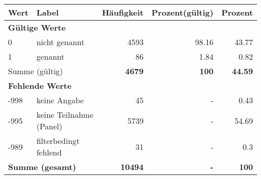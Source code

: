      \begin{longtable}{lXrrr}
     \toprule
     \textbf{Wert} & \textbf{Label} & \textbf{Häufigkeit} & \textbf{Prozent(gültig)} & \textbf{Prozent} \\
     \endhead
     \midrule
     \multicolumn{5}{l}{\textbf{Gültige Werte}}\\

     0 &
     \multicolumn{1}{X}{ nicht genannt   } &


       \num{4593} &
       \num[round-mode=places,round-precision=2]{98.16} &
         \num[round-mode=places,round-precision=2]{43.77} \\

     1 &
     \multicolumn{1}{X}{ genannt   } &


       \num{86} &
       \num[round-mode=places,round-precision=2]{1.84} &
         \num[round-mode=places,round-precision=2]{0.82} \\
     \midrule
     \multicolumn{2}{l}{Summe (gültig)} &
       \textbf{\num{4679}} &
     \textbf{\num{100}} &
       \textbf{\num[round-mode=places,round-precision=2]{44.59}} \\
     \multicolumn{5}{l}{\textbf{Fehlende Werte}}\\
       -998 &
       keine Angabe &
         \num{45} &
        - &
         \num[round-mode=places,round-precision=2]{0.43} \\
       -995 &
       keine Teilnahme (Panel) &
         \num{5739} &
        - &
         \num[round-mode=places,round-precision=2]{54.69} \\
       -989 &
       filterbedingt fehlend &
         \num{31} &
        - &
         \num[round-mode=places,round-precision=2]{0.3} \\
     \midrule
     \multicolumn{2}{l}{\textbf{Summe (gesamt)}} &
          \textbf{\num{10494}} &
        \textbf{-} &
        \textbf{\num{100}} \\
     \bottomrule
     \end{longtable}
     
